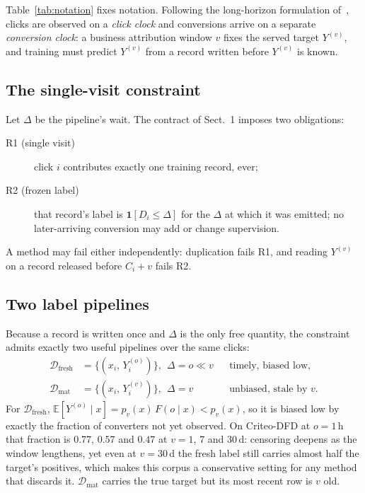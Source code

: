\documentclass[runningheads]{llncs}
\newcommand{\ind}{\mathbf{1}}
\newcommand{\Yo}{Y^{(o)}}
\newcommand{\Yv}{Y^{(v)}}
\begin{document}
Table~\ref{tab:notation} fixes notation. Following the long-horizon formulation
of~\cite{li2026twice}, clicks are observed on a \emph{click clock} and conversions arrive on a
separate \emph{conversion clock}: a business attribution window $v$ fixes the served target $\Yv$,
and training must predict $\Yv$ from a record written before $\Yv$ is known.

\subsection{The single-visit constraint}

Let $\Delta$ be the pipeline's wait. The contract of Sect.~1 imposes two obligations:
\begin{description}
\item[R1 (single visit)] click $i$ contributes exactly one training record, ever;
\item[R2 (frozen label)] that record's label is $\ind[D_i \le \Delta]$ for the $\Delta$ at which it
was emitted; no later-arriving conversion may add or change supervision.
\end{description}
A method may fail either independently: duplication fails R1, and reading $\Yv$ on a record released
before $C_i + v$ fails R2.

\subsection{Two label pipelines}

Because a record is written once and $\Delta$ is the only free quantity, the constraint admits
exactly two useful pipelines over the same clicks:
\begin{align}
\mathcal{D}_{\text{fresh}} &= \{(x_i,\, \Yo_i)\},\ \ \Delta = o \ll v
  &&\text{timely, biased low,}\\
\mathcal{D}_{\text{mat}} &= \{(x_i,\, \Yv_i)\},\ \ \Delta = v
  &&\text{unbiased, stale by } v .
\end{align}
For $\mathcal{D}_{\text{fresh}}$, $\mathbb{E}[\Yo \mid x] = p_v(x)\,F(o \mid x) < p_v(x)$, so it is
biased low by exactly the fraction of converters not yet observed. On Criteo-DFD at $o=1$\,h that
fraction is $0.77$, $0.57$ and $0.47$ at $v=1$, $7$ and $30$\,d: censoring deepens as the window
lengthens, yet even at $v=30$\,d the fresh label still carries almost half the target's positives,
which makes this corpus a conservative setting for any method that discards it.
$\mathcal{D}_{\text{mat}}$ carries the true target but its most recent row is $v$ old.
\end{document}
